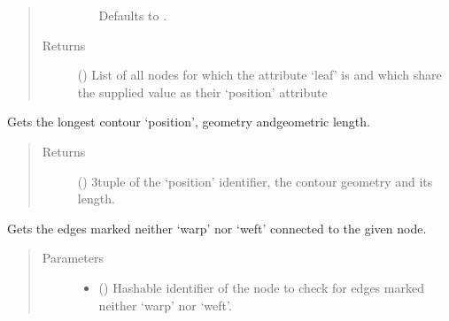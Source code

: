 \documentclass[letterpaper,10pt,english]{sphinxmanual}
\begin{document}
\begin{fulllineitems}
\begin{fulllineitems}
\begin{quote}
\begin{description}
\begin{itemize}
Defaults to .


\end{itemize}

\item[{Returns}] \leavevmode
{} () \textendash{} List of all nodes for which the attribute ‘leaf’ is  and
which share the supplied value as their ‘position’ attribute

\end{description}\end{quote}

\end{fulllineitems}


\begin{fulllineitems}
\label{\detokenize{cockatoo:cockatoo.KnitNetworkBase.longest_position_contour}}
Gets the longest contour ‘position’, geometry andgeometric length.
\begin{quote}\begin{description}
\item[{Returns}] \leavevmode
{} () \textendash{} 3\sphinxhyphen{}tuple of the ‘position’ identifier, the contour geometry and its
length.

\end{description}\end{quote}

\end{fulllineitems}


\begin{fulllineitems}
\label{\detokenize{cockatoo:cockatoo.KnitNetworkBase.node_contour_edges}}
Gets the edges marked neither ‘warp’ nor ‘weft’ connected to the
given node.
\begin{quote}\begin{description}
\item[{Parameters}] \leavevmode\begin{itemize}
\item {} 
 () \textendash{} Hashable identifier of the node to check for edges marked neither
‘warp’ nor ‘weft’.


\end{itemize}
\end{description}
\end{quote}
\end{fulllineitems}
\end{fulllineitems}
\end{document}
